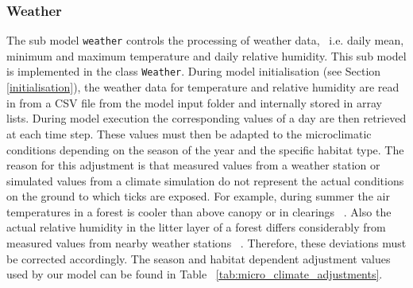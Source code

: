 \documentclass[a4paper, 11pt]{scrartcl}
\newcommand{\inlinecode}[1]{\texttt{\small #1}}
\begin{document}
\subsubsection{Weather}
The sub model \inlinecode{weather} controls the processing of weather data, ~i.e. daily mean, minimum and maximum temperature and daily relative humidity. This sub model is implemented in the class \inlinecode{Weather}. During model initialisation (see Section \ref{initialisation}), the weather data for temperature and relative humidity are read in from a CSV file from the model input folder and internally stored in array lists. During model execution the corresponding values of a day are then retrieved at each time step. These values must then be adapted to the microclimatic conditions depending on the season of the year and the specific habitat type. The reason for this adjustment is that measured values from a weather station or simulated values from a climate simulation do not represent the actual conditions on the ground to which ticks are exposed. For example, during summer the air temperatures in a forest is cooler than above canopy or in clearings ~\cite{Bonan.2016, Geiger.1995}. Also the actual relative humidity in the litter layer of a forest differs considerably from measured values from nearby weather stations ~\cite{Boehnke.2017}. Therefore, these deviations must be corrected accordingly. The season and habitat dependent adjustment values used by our model can be found in Table ~\ref{tab:micro_climate_adjustments}.
\end{document}
